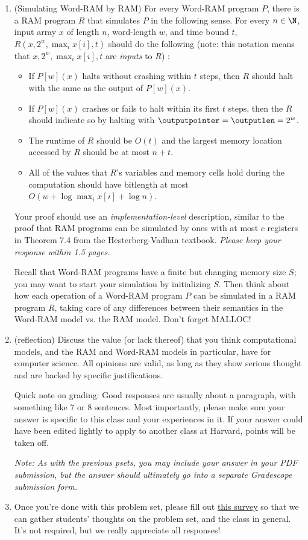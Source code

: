 \documentclass[11pt]{article}
\begin{document}
\begin{enumerate}
\item (Simulating Word-RAM by RAM)
For every Word-RAM program $P$, there is a RAM program $R$ that simulates $P$ in the following sense.  For every $n \in \N$, input array $x$ of length $n$, word-length $w$, and time bound $t$, $R(x,2^w, \max_i x[i],t)$ should do the following (note: this notation means that $x, 2^w, \max_i x[i], t$ are \emph{inputs} to $R$) :
\begin{itemize}
    \item If $P[w](x)$ halts without crashing within $t$ steps, then $R$ should halt with the same as the output of $P[w](x)$.
    \item If $P[w](x)$ crashes or fails to halt within its first $t$ steps, then the $R$ should indicate so by halting with $\outputpointer=\outputlen=2^w$.
    \item The runtime of $R$ should be $O(t)$ and the largest memory location accessed by $R$ should be at most $n+t$.
    \item All of the values that $R$'s variables and memory cells hold during the computation should have bitlength at most $O(w+\log \max_i x[i] + \log n)$.
\end{itemize}
Your proof should use an {\em implementation-level} description, similar to the proof that RAM programs can be simulated by ones with at most $c$ registers in Theorem 7.4 from the Hesterberg-Vadhan textbook. \textit{Please keep your response within 1.5 pages.}

Recall that Word-RAM programs have a finite but changing memory size $S$; you may want to start your simulation by initializing $S$. Then think about how each operation of a Word-RAM program $P$ can be simulated in a RAM program $R$, taking care of any differences between their semantics in the Word-RAM model vs. the RAM model. Don't forget MALLOC!

\item (reflection) Discuss the value (or lack thereof) that you think computational models, and the RAM and Word-RAM models in particular, have for computer science.  All opinions are valid, as long as they show serious thought and are backed by specific justifications.

Quick note on grading: Good responses are usually about a paragraph, with something like 7 or 8 sentences. Most importantly, please make sure your answer is specific to this class and your experiences in it. If your answer could have been edited lightly to apply to another class at Harvard, points will be taken off.

\textit{Note: As with the previous psets, you may include your answer in your PDF submission, but the answer should ultimately go into a separate Gradescope submission form.}

\item Once you're done with this problem set, please fill out \href{https://forms.gle/ZiNMNQ9nosYKTBBR7}{this survey} so that we can gather students' thoughts on the problem set, and the class in general. It's not required, but we really appreciate all responses!

\end{enumerate}
\end{document}
